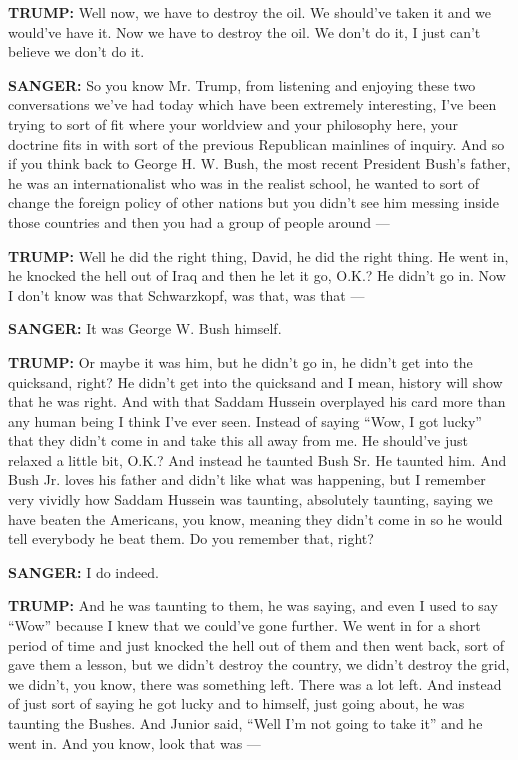 \textbf{TRUMP:} Well now, we have to destroy the oil. We should've taken
it and we would've have it. Now we have to destroy the oil. We don't do
it, I just can't believe we don't do it.

\textbf{SANGER:} So you know Mr. Trump, from listening and enjoying
these two conversations we've had today which have been extremely
interesting, I've been trying to sort of fit where your worldview and
your philosophy here, your doctrine fits in with sort of the previous
Republican mainlines of inquiry. And so if you think back to George H.
W. Bush, the most recent President Bush's father, he was an
internationalist who was in the realist school, he wanted to sort of
change the foreign policy of other nations but you didn't see him
messing inside those countries and then you had a group of people around
---

\textbf{TRUMP:} Well he did the right thing, David, he did the right
thing. He went in, he knocked the hell out of Iraq and then he let it
go, O.K.? He didn't go in. Now I don't know was that Schwarzkopf, was
that, was that ---

\textbf{SANGER:} It was George W. Bush himself.

\textbf{TRUMP:} Or maybe it was him, but he didn't go in, he didn't get
into the quicksand, right? He didn't get into the quicksand and I mean,
history will show that he was right. And with that Saddam Hussein
overplayed his card more than any human being I think I've ever seen.
Instead of saying ``Wow, I got lucky'' that they didn't come in and take
this all away from me. He should've just relaxed a little bit, O.K.? And
instead he taunted Bush Sr. He taunted him. And Bush Jr. loves his
father and didn't like what was happening, but I remember very vividly
how Saddam Hussein was taunting, absolutely taunting, saying we have
beaten the Americans, you know, meaning they didn't come in so he would
tell everybody he beat them. Do you remember that, right?

\textbf{SANGER:} I do indeed.

\textbf{TRUMP:} And he was taunting to them, he was saying, and even I
used to say ``Wow'' because I knew that we could've gone further. We
went in for a short period of time and just knocked the hell out of them
and then went back, sort of gave them a lesson, but we didn't destroy
the country, we didn't destroy the grid, we didn't, you know, there was
something left. There was a lot left. And instead of just sort of saying
he got lucky and to himself, just going about, he was taunting the
Bushes. And Junior said, ``Well I'm not going to take it'' and he went
in. And you know, look that was ---

